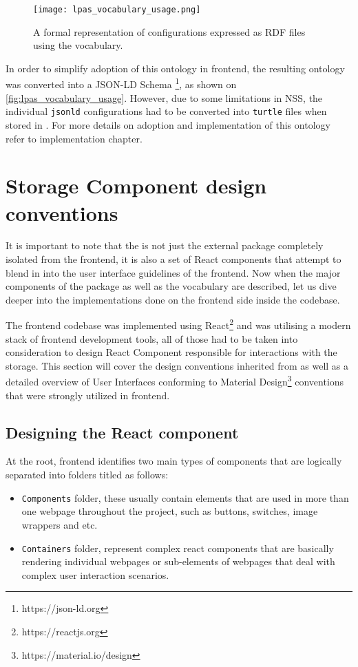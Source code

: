 \begin{figure}[h]
\centering
\texttt{[image: lpas\_vocabulary\_usage.png]}
\caption{A formal representation of \lpa{} configurations expressed as RDF files using the \lpas{} vocabulary.}
\label{fig:lpas_vocabulary_usage}
\end{figure}

In order to simplify adoption of this ontology in \lpa{} frontend, the resulting ontology was converted into a JSON-LD Schema \footnote{https://json-ld.org}, as shown on \autoref{fig:lpas_vocabulary_usage}. However, due to some limitations in NSS, the individual \texttt{jsonld} configurations had to be converted into \texttt{turtle} files when stored in \solid{}. For more details on adoption and  implementation of this ontology refer to implementation chapter.


\section{Storage Component design conventions}


It is important to note that the \lpas{} is not just the external package completely isolated from the \lpa{} frontend, it is also a set of React components that attempt to blend in into the user interface guidelines of the frontend. Now when the major components of the \lpas{} package as well as the \lpas{} vocabulary are described, let us dive deeper into the implementations done on the frontend side inside the \lpa{} codebase. 

The \lpa{} frontend codebase was implemented using React\footnote{https://reactjs.org} and was utilising a modern stack of frontend development tools, all of those had to be taken into consideration to design React Component responsible for interactions with the storage. This section will cover the design conventions inherited from \lpa{} as well as a detailed overview of User Interfaces conforming to Material Design\footnote{https://material.io/design} conventions that were strongly utilized in \lpa{} frontend.  

\subsection{Designing the React component}

At the root, \lpa{} frontend identifies two main types of components that are logically separated into folders titled as follows:
\begin{itemize}
	\item \texttt{Components} folder, these usually contain elements that are used in more than one webpage throughout the project, such as buttons, switches, image wrappers and etc.
	\item \texttt{Containers} folder, represent complex react components that are basically rendering individual webpages or sub-elements of webpages that deal with complex user interaction scenarios.
\end{itemize}

